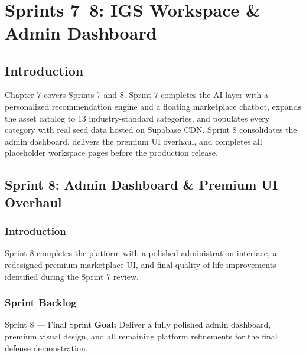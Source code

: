 ﻿﻿%
\chapter{Sprints 7--8: IGS Workspace \& Admin Dashboard}
\chaptersommaire
\clearpage

\section*{Introduction}
Chapter 7 covers Sprints 7 and 8. Sprint 7 completes the AI layer with a personalized recommendation engine and a floating marketplace chatbot, expands the asset catalog to 13 industry-standard categories, and populates every category with real seed data hosted on Supabase CDN. Sprint 8 consolidates the admin dashboard, delivers the premium UI overhaul, and completes all placeholder workspace pages before the production release.


\section{Sprint 8: Admin Dashboard \& Premium UI Overhaul}

\subsection*{Introduction}
Sprint 8 completes the platform with a polished administration interface, a redesigned premium marketplace UI, and final quality-of-life improvements identified during the Sprint 7 review.

\subsection{Sprint Backlog}

\begin{sprintbox}{Sprint 8 --- Final Sprint}
\textbf{Goal:} Deliver a fully polished admin dashboard, premium visual design, and all remaining platform refinements for the final defense demonstration.
\end{sprintbox}

\vspace{0.4cm}

